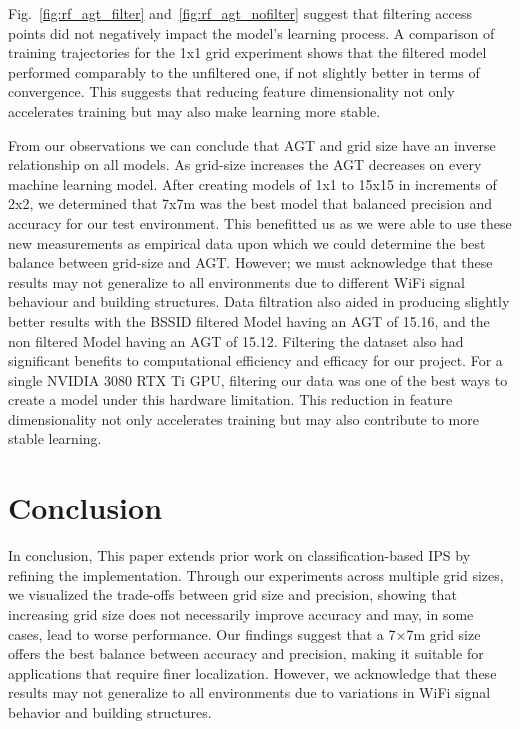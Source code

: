\documentclass[runningheads]{llncs}
\begin{document}
Fig.~\ref{fig:rf_agt_filter} and~\ref{fig:rf_agt_nofilter} suggest that filtering access points did not negatively impact the model's learning process. A comparison of training trajectories for the 1x1 grid experiment shows that the filtered model performed comparably to the unfiltered one, if not slightly better in terms of convergence. This suggests that reducing feature dimensionality not only accelerates training but may also make learning more stable.

From our observations we can conclude that AGT and grid size have an inverse relationship on all models. As grid-size increases the AGT decreases on every machine learning model. After creating models of 1x1 to 15x15 in increments of 2x2, we determined that 7x7m was the best model that balanced precision and accuracy for our test environment. This benefitted us as we were able to use these new measurements as empirical data upon which we could determine the best balance between grid-size and AGT. However; we must acknowledge that these results may not generalize to all environments due to different WiFi signal behaviour and building structures. Data filtration also aided in producing slightly better results with the BSSID filtered Model having an AGT of 15.16, and the non filtered Model having an AGT of 15.12. Filtering the dataset also had significant benefits to computational efficiency and efficacy for our project. For a single NVIDIA 3080 RTX Ti GPU, filtering our data was one of the best ways to create a model under this hardware limitation. This reduction in feature dimensionality not only accelerates training but may also contribute to more stable learning.





\section{Conclusion}
In conclusion, This paper extends prior work on classification-based IPS \cite{LRE1} by refining the implementation. Through our experiments across multiple grid sizes, we visualized the trade-offs between grid size and precision, showing that increasing grid size does not necessarily improve accuracy and may, in some cases, lead to worse performance. Our findings suggest that a 7×7m grid size offers the best balance between accuracy and precision, making it suitable for applications that require finer localization. However, we acknowledge that these results may not generalize to all environments due to variations in WiFi signal behavior and building structures.
\end{document}
